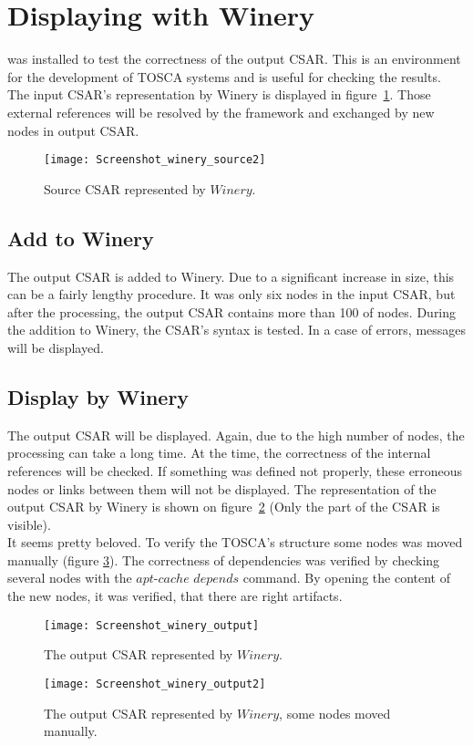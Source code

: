 \section{Displaying with Winery}\label{sec:checkwin}
  was installed to test the correctness of the output CSAR. 
 This is an environment for the development of TOSCA systems and is useful for checking the results. %
 The input CSAR's representation by Winery is displayed in figure~\ref{fig:winery_source2}.
 Those external references will be resolved by the framework and exchanged by new nodes in output CSAR. 
 \begin{figure}[ht]   
 	\centering
 	\texttt{[image: Screenshot\_winery\_source2]}
 	\caption{Source CSAR represented by $Winery$.}
 	\label{fig:winery_source2}
 \end{figure}

 \subsection*{Add to Winery}
 The output CSAR is added to Winery.
 Due to a significant increase in size, this can be a fairly lengthy procedure.
 It was only six nodes in the input CSAR, but after the processing, the output CSAR contains more than 100 of nodes.
 During the addition to Winery, the CSAR's syntax is tested.
 In a case of errors, messages will be displayed.
 
 \subsection*{Display by Winery}
 The output CSAR will be displayed.
 Again, due to the high number of nodes, the processing can take a long time. 
 At the time, the correctness of the internal references will be checked.
 If something was defined not properly, these erroneous nodes or links between them will not be displayed.
The representation of the output CSAR by Winery is shown on figure~\ref{fig:winery_output} (Only the part of the CSAR is visible).\\
 It seems pretty beloved.
 To verify the TOSCA's structure some nodes was moved manually (figure \ref{fig:winery_output2}). 
 The correctness of dependencies was verified by checking several nodes with the $apt$-$cache$ $depends$ command.
 By opening the content of the new nodes, it was verified, that there are right artifacts.
 \begin{figure}[ht]   
 	\centering
 	\texttt{[image: Screenshot\_winery\_output]}  
 	\caption{The output CSAR represented by $Winery$.}
 	\label{fig:winery_output}
 \end{figure}
 \begin{figure}[ht]   
 	\centering
 	\texttt{[image: Screenshot\_winery\_output2]}
 	\caption{The output CSAR represented by $Winery$, some nodes moved manually.}
 	\label{fig:winery_output2}
 \end{figure}

